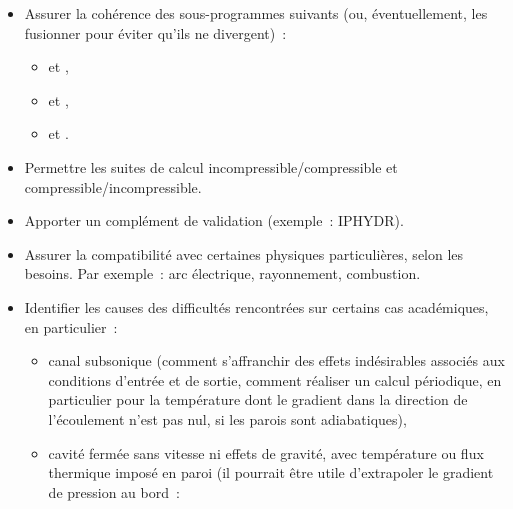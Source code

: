 \begin{itemize}
\item Assurer la cohérence des sous-programmes suivants (ou, éventuellement,
les fusionner pour éviter qu'ils ne divergent)~:
        \begin{itemize}
        \item {} et ,
        \item {} et ,
        \item {} et .
        \end{itemize}
\item Permettre les suites de calcul incompressible/compressible et
        compressible/incompressible.
\item Apporter un complément de validation (exemple~: IPHYDR).
\item Assurer la compatibilité avec certaines physiques particulières, selon
        les besoins. Par exemple~: arc électrique, rayonnement, combustion.
\item Identifier les causes des difficultés rencontrées sur certains cas
académiques, en particulier~:
        \begin{itemize}
        \item canal subsonique (comment s'affranchir des effets indésirables
        associés aux conditions d'entrée et de sortie, comment réaliser un
        calcul périodique, en particulier pour la température dont le
        gradient dans la direction de l'écoulement n'est pas nul, si
        les parois sont adiabatiques),
        \item cavité fermée sans vitesse ni effets de gravité,
        avec température ou flux thermique imposé en paroi (il pourrait
        être utile d'extrapoler le gradient de pression au bord~:

\end{itemize}
\end{itemize}
